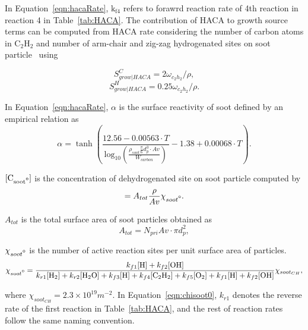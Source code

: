In Equation~\eqref{eqn:hacaRate}, $\mathrm{k_{f4}}$ refers to forawrd reaction rate of 4th reaction in reaction 4 in Table~\ref{tab:HACA}. The contribution of HACA to growth source terms  can be computed from HACA rate considering the number of carbon atoms in $\mathrm{C_2H_2}$ and number of arm-chair and zig-zag hydrogenated sites on soot particle~\cite{blanquart2009analyzing} using

\begin{equation}
	S^C_{grow|HACA} = 2\omega_{c_2h_2}/\rho
	\label{eqn:SCgrowHACA},
\end{equation}
\begin{equation}
	S^H_{grow|HACA} = 0.25\omega_{c_2h_2}/\rho
	\label{eqn:SHgrowHACA}.
\end{equation}

In Equation~\eqref{eqn:hacaRate}, $\alpha$ is the surface reactivity of soot defined by an empirical relation as 
\begin{equation}
	\alpha = \tanh 
	\left(
	\frac{12.56 - 0.00563\cdot T}
	{\mbox{log}_{10}
		\left( \frac{\rho_{soot}\frac{\pi}{6}d^3_p \cdot Av}{W_{carbon}} \right) } -1.38+0.00068\cdot T
	\right)
	\label{eqn:alpha}.
\end{equation}

$\mathrm{[C_{soot\mbox{\textdegree}}]}$ is the concentration of dehydrogenated site on soot particle computed by
\begin{equation}
	[\mathrm{C_{soot\mbox{\textdegree}}}] = A_{tot}\frac{\rho}{Av}\chi_{soot\mbox{\textdegree}}
	\label{eqn:csoot0}.
\end{equation}

$A_{tot}$ is the total surface area of soot particles obtained as
\begin{equation}
	A_{tot} = N_{pri}Av\cdot \pi d^2_p
	\label{eqn:Atot},
\end{equation}

$\chi_{soot\mbox{\textdegree}}$ is the number of active reaction sites per unit surface area of particles.
\begin{equation}
	\chi_{soot\mbox{\textdegree}} = 
	\frac
	{k_{f1}[\mathrm{H}]+k_{f2}[\mathrm{OH}]}
	{k_{r1}[\mathrm{H_2}]+k_{r2}[\mathrm{H_2O}]+k_{f3}[\mathrm{H}]+k_{f4}[\mathrm{C_2H_2}]+k_{f5}[\mathrm{O_2}]+k_{f1}[\mathrm{H}]+k_{f2}[\mathrm{OH}]} \chi_{soot_{CH}}
	\label{eqn:chisoot0},
\end{equation}

\noindent where $\chi_{soot_{CH}}=2.3\times 10^{19} m^{-2}$. In Equation~\eqref{eqn:chisoot0}, $k_{r1}$ denotes the reverse rate of the first reaction in Table~\ref{tab:HACA}, and the rest of reaction rates follow the same naming convention.


